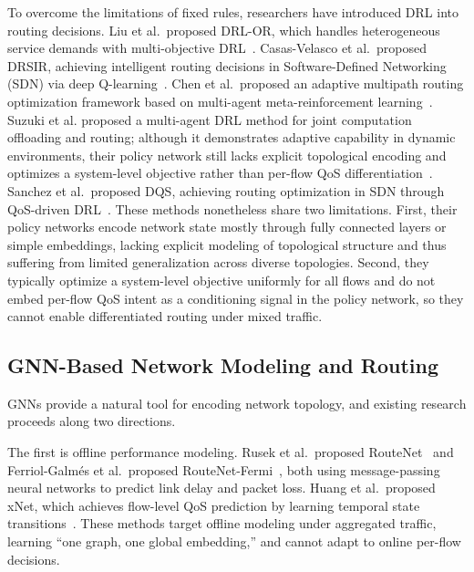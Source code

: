 To overcome the limitations of fixed rules, researchers have introduced DRL into routing decisions. Liu et al.\ proposed DRL-OR, which handles heterogeneous service demands with multi-objective DRL~\cite{Liu2021_DRLOr_INFOCOM}. Casas-Velasco et al.\ proposed DRSIR, achieving intelligent routing decisions in Software-Defined Networking (SDN) via deep Q-learning~\cite{CasasVelasco2021_DRSIR_TNSM}. Chen et al.\ proposed an adaptive multipath routing optimization framework based on multi-agent meta-reinforcement learning~\cite{Chen2022_MultiagentMeta_TNNLS}. Suzuki et al. proposed a multi-agent DRL method for joint computation offloading and routing; although it demonstrates adaptive capability in dynamic environments, their policy network still lacks explicit topological encoding and optimizes a system-level objective rather than per-flow QoS differentiation~\cite{Suzuki2023_MADRL_Routing_TNSM}. Sanchez et al.\ proposed DQS, achieving routing optimization in SDN through QoS-driven DRL~\cite{Sanchez2024_DQS_JPDC}. These methods nonetheless share two limitations. First, their policy networks encode network state mostly through fully connected layers or simple embeddings, lacking explicit modeling of topological structure and thus suffering from limited generalization across diverse topologies. Second, they typically optimize a system-level objective uniformly for all flows and do not embed per-flow QoS intent as a conditioning signal in the policy network, so they cannot enable differentiated routing under mixed traffic.

\subsection{GNN-Based Network Modeling and Routing}

GNNs provide a natural tool for encoding network topology, and existing research proceeds along two directions.

The first is offline performance modeling. Rusek et al.\ proposed RouteNet~\cite{Rusek2020_JSAC_RouteNet} and Ferriol-Galm\'{e}s et al.\ proposed RouteNet-Fermi~\cite{FerriolGalmes_2023_RouteNetFermi}, both using message-passing neural networks to predict link delay and packet loss. Huang et al.\ proposed xNet, which achieves flow-level QoS prediction by learning temporal state transitions~\cite{Huang2024_ToN_xNetModeling}. These methods target offline modeling under aggregated traffic, learning ``one graph, one global embedding,'' and cannot adapt to online per-flow decisions.


